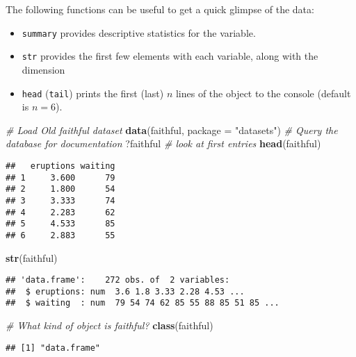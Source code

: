 \documentclass[]{book}
\newenvironment{Shaded}{\begin{snugshade}}{\end{snugshade}}
\newcommand{\KeywordTok}[1]{\textcolor[rgb]{0.13,0.29,0.53}{\textbf{#1}}}
\newcommand{\DataTypeTok}[1]{\textcolor[rgb]{0.13,0.29,0.53}{#1}}
\newcommand{\StringTok}[1]{\textcolor[rgb]{0.31,0.60,0.02}{#1}}
\newcommand{\CommentTok}[1]{\textcolor[rgb]{0.56,0.35,0.01}{\textit{#1}}}
\newcommand{\NormalTok}[1]{#1}
\providecommand{\tightlist}{%
  \setlength{\itemsep}{0pt}\setlength{\parskip}{0pt}}
\begin{document}
The following functions can be useful to get a quick glimpse of the
data:

\begin{itemize}
\tightlist
\item
  \texttt{summary} provides descriptive statistics for the variable.
\item
  \texttt{str} provides the first few elements with each variable, along
  with the dimension
\item
  \texttt{head} (\texttt{tail}) prints the first (last) \(n\) lines of
  the object to the console (default is \(n=6\)).
\end{itemize}

\begin{Shaded}
\begin{Highlighting}[]
\CommentTok{# Load Old faithful dataset}
\KeywordTok{data}\NormalTok{(faithful, }\DataTypeTok{package =} \StringTok{"datasets"}\NormalTok{)}
\CommentTok{# Query the database for documentation}
\NormalTok{?faithful}
\CommentTok{# look at first entries}
\KeywordTok{head}\NormalTok{(faithful)}
\end{Highlighting}
\end{Shaded}

\begin{verbatim}
##   eruptions waiting
## 1     3.600      79
## 2     1.800      54
## 3     3.333      74
## 4     2.283      62
## 5     4.533      85
## 6     2.883      55
\end{verbatim}

\begin{Shaded}
\begin{Highlighting}[]
\KeywordTok{str}\NormalTok{(faithful)}
\end{Highlighting}
\end{Shaded}

\begin{verbatim}
## 'data.frame':    272 obs. of  2 variables:
##  $ eruptions: num  3.6 1.8 3.33 2.28 4.53 ...
##  $ waiting  : num  79 54 74 62 85 55 88 85 51 85 ...
\end{verbatim}

\begin{Shaded}
\begin{Highlighting}[]
\CommentTok{# What kind of object is faithful? }
\KeywordTok{class}\NormalTok{(faithful)}
\end{Highlighting}
\end{Shaded}

\begin{verbatim}
## [1] "data.frame"
\end{verbatim}
\end{document}

